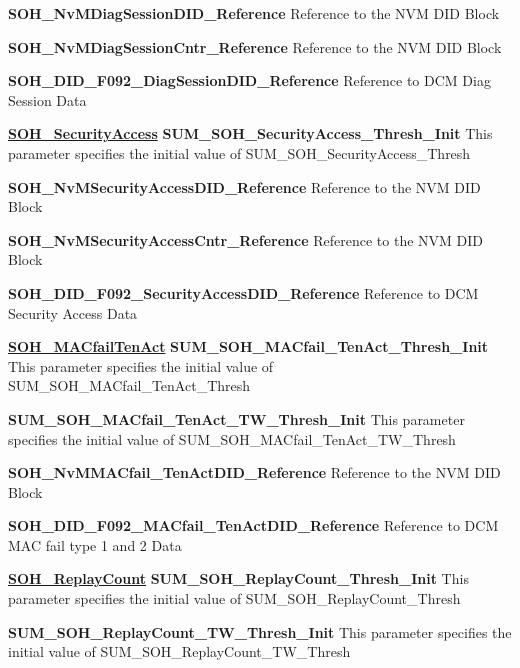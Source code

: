 \textbf{SOH\_NvMDiagSessionDID\_Reference}\newline
Reference to the NVM DID Block

\textbf{SOH\_NvMDiagSessionCntr\_Reference}\newline
Reference to the NVM DID Block

\textbf{SOH\_DID\_F092\_DiagSessionDID\_Reference}\newline
Reference to DCM Diag Session Data

\textbf{\underline{SOH\_SecurityAccess}}\newline
\textbf{SUM\_SOH\_SecurityAccess\_Thresh\_Init}\newline
This parameter specifies the initial value of SUM\_SOH\_SecurityAccess\_Thresh

\textbf{SOH\_NvMSecurityAccessDID\_Reference}\newline
Reference to the NVM DID Block

\textbf{SOH\_NvMSecurityAccessCntr\_Reference}\newline
Reference to the NVM DID Block

\textbf{SOH\_DID\_F092\_SecurityAccessDID\_Reference}\newline
Reference to DCM Security Access Data

\textbf{\underline{SOH\_MACfailTenAct}}\newline
\textbf{SUM\_SOH\_MACfail\_TenAct\_Thresh\_Init}\newline
This parameter specifies the initial value of SUM\_SOH\_MACfail\_TenAct\_Thresh

\textbf{SUM\_SOH\_MACfail\_TenAct\_TW\_Thresh\_Init}\newline
This parameter specifies the initial value of SUM\_SOH\_MACfail\_TenAct\_TW\_Thresh

\textbf{SOH\_NvMMACfail\_TenActDID\_Reference}\newline
Reference to the NVM DID Block

\textbf{SOH\_DID\_F092\_MACfail\_TenActDID\_Reference}\newline
Reference to DCM MAC fail type 1 and 2 Data

\textbf{\underline{SOH\_ReplayCount}}\newline
\textbf{SUM\_SOH\_ReplayCount\_Thresh\_Init}\newline
This parameter specifies the initial value of SUM\_SOH\_ReplayCount\_Thresh

\textbf{SUM\_SOH\_ReplayCount\_TW\_Thresh\_Init}\newline
This parameter specifies the initial value of SUM\_SOH\_ReplayCount\_TW\_Thresh


